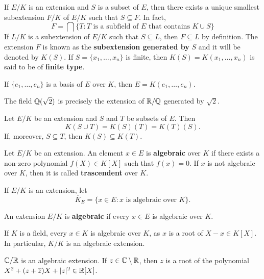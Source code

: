 \chapter{}

If $E/K$ is an extension and $S$ is a subset of $E$, then
there exists a unique smallest 
subextension $F/K$ of $E/K$ such that
$S\subseteq F$. In fact, 
\[
	F=\bigcap\{T:\text{$T$ is a subfield of $E$ that contains $K\cup S$}\} 
\]
If $L/K$ is a subextension of $E/K$ such that 
$S\subseteq L$, then $F\subseteq L$ by definition. The 
extension $F$ is known as the \textbf{subextension generated by} 
$S$ and
it will be denoted by $K(S)$. 
If $S=\{x_1,\dots,x_n\}$ is finite,
then $K(S)=K(x_1,\dots,x_n)$ is said to be of \textbf{finite type}. 

\begin{example}
	If $\{e_1,\dots,e_n\}$ is a basis of $E$ over $K$, 
	then $E=K(e_1,\dots,e_n)$. 
\end{example}

\begin{example}
	The field $\mathbb{Q}(\sqrt{2})$ is precisely the extension 
	of $\mathbb{R}/\mathbb{Q}$ generated by $\sqrt{2}$. 
\end{example}

Let $E/K$ be an extension and $S$ and $T$ be subsets of $E$.
Then 
\[
	K(S\cup T)=K(S)(T)=K(T)(S).
\]
If, moreover, 
$S\subseteq T$, then $K(S)\subseteq K(T)$. 


\begin{definition}
	Let $E/K$ be an extension. An element $x\in E$
	is \textbf{algebraic} over $K$ if there
	exists a non-zero polynomial 
	$f(X)\in K[X]$ such that $f(x)=0$. If $x$ is
	not algebraic over $K$, 
	then it is called \textbf{trascendent} over $K$.
\end{definition}

If $E/K$ is an extension, let 
\[
	\overline{K}_E=\{x\in E:x\text{ is algebraic over }K\}. 
\]

\begin{definition}	
	An extension $E/K$ is \textbf{algebraic} if 
	every $x\in E$ is algebraic over $K$. 
\end{definition}

If $K$ is a field, every $x\in K$ is algebraic over $K$,
as $x$ is a root of $X-x\in K[X]$. In particular, $K/K$ is
an algebraic extension. 

\begin{example}
	$\mathbb{C}/\mathbb{R}$ is an algebraic extension. If $z\in\mathbb{C}\setminus\mathbb{R}$, then
	$z$ is a root of the polynomial 
	$X^2+(z+\overline{z})X+|z|^2\in\mathbb{R}[X]$. 
\end{example}

